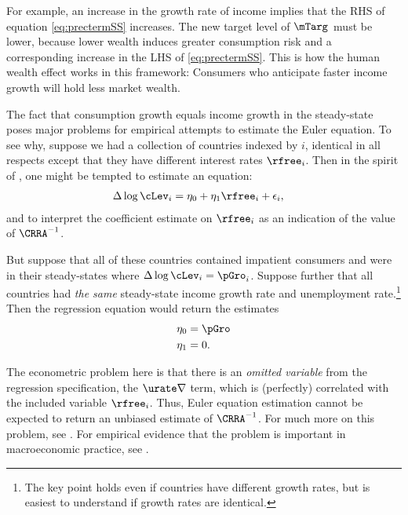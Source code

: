 \documentclass{\handout}
\begin{document}
For example, an increase in the growth rate of income implies that the
RHS of equation \eqref{eq:prectermSS} increases.  The new target level of
$\mTarg^{\null}$ must be lower, because lower wealth induces greater consumption risk and a corresponding increase in the LHS of \eqref{eq:prectermSS}.  This is how the human wealth effect works in this framework:
Consumers who anticipate faster income growth will hold less market wealth.

The fact that consumption growth equals income growth in the
steady-state poses major problems for empirical attempts to estimate
the Euler equation.  To see why, suppose we had a collection of
countries indexed by $i$, identical in all respects except that
they have different interest rates $\rfree_{i}$.
Then in the spirit of \cite{hallSubstitution}, one might be
tempted to estimate an equation:
\begin{equation}\begin{gathered}\begin{aligned}
        \Delta \log \cLev_{i} & =  \eta_{0} + \eta_{1} \rfree_{i}+\epsilon_{i},
\end{aligned}\end{gathered}\end{equation}
and to interpret the coefficient estimate on $\rfree_{i}$ as an indication
of the value of $\CRRA^{-1}$.

But suppose that all of these countries contained impatient consumers
and were in their steady-states where $\Delta \log \cLev_{i} = \pGro_{i}$.
Suppose further
that all countries had {\it the same} steady-state income growth rate and
unemployment rate.\footnote{The key point holds even if countries have different
growth rates, but is easiest to understand if growth rates are identical.}
Then the regression equation would return the estimates
\begin{equation}\begin{gathered}\begin{aligned}
        \eta_{0} & =  \pGro  \\
        \eta_{1} & =  0.
\end{aligned}\end{gathered}\end{equation}

The econometric problem here is that there is an {\it omitted
variable} from the regression specification, the $\urate \nabla$ term, which is (perfectly) correlated with the included
variable $\rfree_{i}$.  Thus, Euler equation estimation cannot be expected to
return an unbiased estimate of $\CRRA^{-1}$.  For much more on this
problem, see \cite{carroll:death}.  For empirical evidence
that the problem is important in macroeconomic practice, see \cite{ParkerPrestonPrecaution}.
\end{document}
